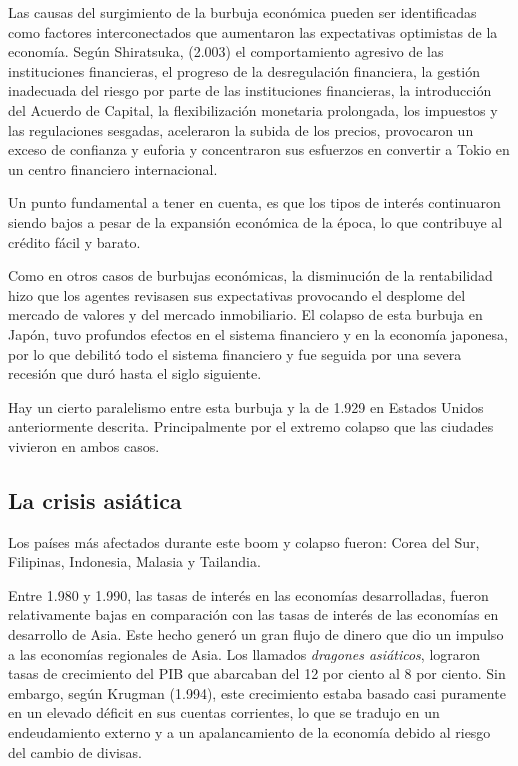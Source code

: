 Las causas del surgimiento de la burbuja económica pueden ser identificadas como factores interconectados que aumentaron las expectativas optimistas de la economía. Según Shiratsuka, (2.003) el comportamiento agresivo de las instituciones financieras, el progreso de la desregulación financiera, la gestión inadecuada del riesgo por parte de las instituciones financieras, la introducción del Acuerdo de Capital, la flexibilización monetaria prolongada, los impuestos y las regulaciones sesgadas, aceleraron la subida de los precios, provocaron un exceso de confianza y euforia y concentraron sus esfuerzos en convertir a Tokio en un centro financiero internacional. 

Un punto fundamental a tener en cuenta, es que los tipos de interés continuaron siendo bajos a pesar de la expansión económica de la época, lo que contribuye al crédito fácil y barato.

Como en otros casos de burbujas económicas, la disminución de la rentabilidad hizo que los agentes revisasen sus expectativas provocando el desplome del mercado de valores y del mercado inmobiliario. El colapso de esta burbuja en Japón, tuvo profundos efectos en el sistema financiero y en la economía japonesa, por lo que debilitó todo el sistema financiero y fue seguida por una severa recesión que duró hasta el siglo siguiente. 

Hay un cierto paralelismo entre esta burbuja y la de 1.929 en Estados Unidos anteriormente descrita. Principalmente por el extremo colapso que las ciudades vivieron en ambos casos. 

\subsection{La crisis asiática}   

Los países más afectados durante este boom y colapso fueron: Corea del Sur, Filipinas, Indonesia, Malasia y Tailandia.

Entre 1.980 y 1.990, las tasas de interés en las economías desarrolladas, fueron relativamente bajas en comparación con las tasas de interés de las economías en desarrollo de Asia. Este hecho generó un gran flujo de dinero que dio un impulso a las economías regionales de Asia. Los llamados \emph{dragones asiáticos}, lograron tasas de crecimiento del PIB que abarcaban del 12 por ciento al 8 por ciento. Sin embargo, según Krugman (1.994), este crecimiento estaba basado casi puramente en un elevado déficit en sus cuentas corrientes, lo que se tradujo en un endeudamiento externo y a un apalancamiento de la economía debido al riesgo del cambio de divisas. 

